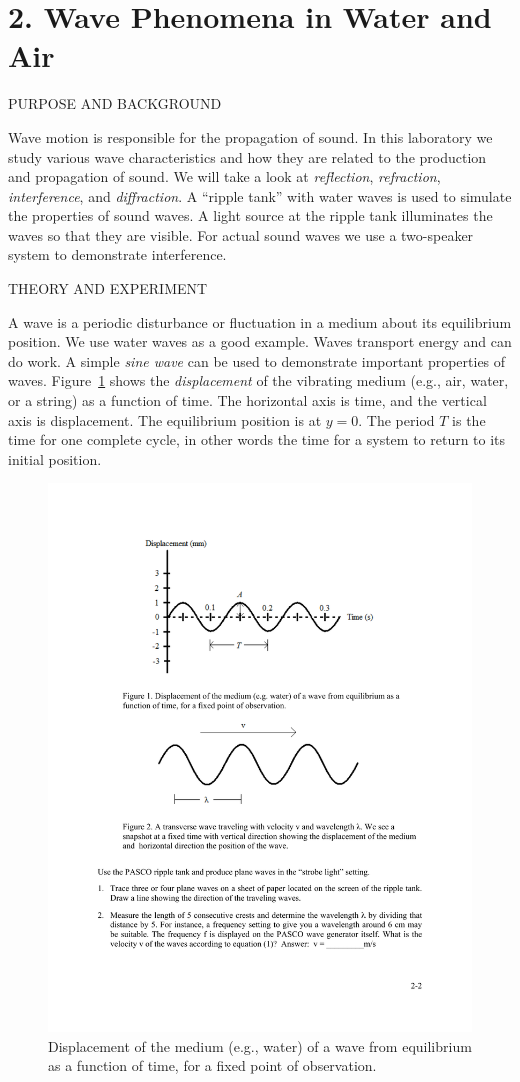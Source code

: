 \documentclass[11pt]{NSF}
\begin{document}
     
\section{2. Wave Phenomena in Water and Air}

PURPOSE AND BACKGROUND

Wave motion is responsible for the propagation of sound. In this laboratory we
study various wave characteristics and how they are related to the production
and propagation of sound. We will take a look at {\em reflection}, 
{\em refraction}, {\em interference}, and {\em diffraction}. 
A ``ripple tank” with water waves is used to
simulate the properties of sound waves. A light source at the ripple tank
illuminates the waves so that they are visible. For actual sound waves we use a
two-speaker system to demonstrate interference.

THEORY AND EXPERIMENT

A wave is a periodic disturbance or fluctuation in a medium about its
equilibrium position. We use water waves as a good example. Waves transport
energy and can do work. A simple {\em sine wave} 
can be used to demonstrate important properties of waves. 
Figure~\ref{f:1} shows the {\em displacement} of the vibrating medium
(e.g., air, water, or a string) as a function of time. The horizontal axis is
time, and the vertical axis is displacement. The equilibrium position
is at $y=0$. The period $T$ is the time for one complete cycle, in other words the
time for a system to return to its initial position.
%
\begin{figure}[hbtp]
\begin{center}
\includegraphics[width=.6\textwidth]{fig2_1}
\caption{Displacement of the medium (e.g., water) of a wave from equilibrium 
as a function of time, for a fixed point of observation.}
\label{f:1}
\end{center}
\end{figure}
%
\end{document}

